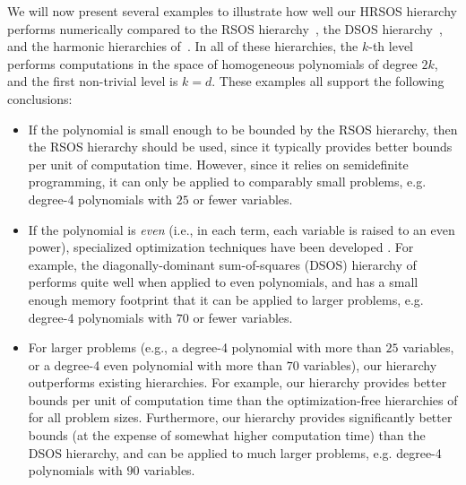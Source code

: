 \documentclass[11pt]{article}
\numberwithin{theorem}{section}
\theoremstyle{definition}
\begin{document}
We will now present several examples to illustrate how well our HRSOS hierarchy performs numerically compared to the RSOS hierarchy~\cite{reznick1995uniform, doherty2012convergence,fang2021sum}, the DSOS hierarchy~\cite{AM19}, and the harmonic hierarchies of~\cite{cristancho2024harmonic}. In all of these hierarchies, the $k$-th level performs computations in the space of homogeneous polynomials of degree $2k$, and the first non-trivial level is $k=d$. These examples all support the following conclusions:
\begin{itemize}
    \item If the polynomial is small enough to be bounded by the RSOS hierarchy, then the RSOS hierarchy should be used, since it typically provides better bounds per unit of computation time. However, since it relies on semidefinite programming, it can only be applied to comparably small problems, e.g. degree-4 polynomials with $25$ or fewer variables.

    \item If the polynomial is \emph{even} (i.e., in each term, each variable is raised to an even power), specialized optimization techniques have been developed \cite{polya1974george,de2005equivalence,de2015error,AM19,ahmed2019maximization,ahmed2021two,vargas2023copositive}. For example, the diagonally-dominant sum-of-squares (DSOS) hierarchy of \cite{AM19} performs quite well when applied to even polynomials, and has a small enough memory footprint that it can be applied to larger problems, e.g. degree-4 polynomials with $70$ or fewer variables.

    \item For larger problems (e.g., a degree-4 polynomial with more than $25$ variables, or a degree-4 even polynomial with more than $70$ variables), our hierarchy outperforms existing hierarchies.
    For example, our hierarchy provides better bounds per unit of computation time than the optimization-free hierarchies of \cite{cristancho2024harmonic} for all problem sizes. Furthermore, our hierarchy provides significantly better bounds (at the expense of somewhat higher computation time) than the DSOS hierarchy, and can be applied to much larger problems, e.g. degree-4 polynomials with $90$ variables.
\end{itemize}
\end{document}
